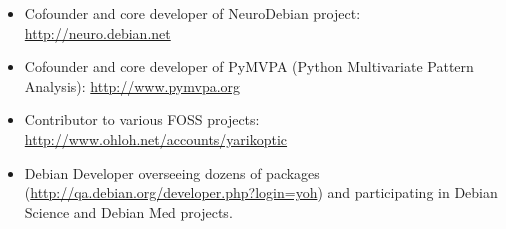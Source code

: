 \documentclass[12pt,overlapped,line]{res}
\begin{document}
\begin{resume}
\begin{itemize}[parsep=0.2em,leftmargin=1em]
 \item Cofounder and core developer of NeuroDebian project: \url{http://neuro.debian.net}

 \item Cofounder and core developer of PyMVPA (Python Multivariate Pattern Analysis): \url{http://www.pymvpa.org}

 \item Contributor to various FOSS projects: \url{http://www.ohloh.net/accounts/yarikoptic}

 \item Debian Developer overseeing dozens of packages
   (\url{http://qa.debian.org/developer.php?login=yoh}) and
   participating in Debian Science and Debian Med projects.

 \end{itemize}


\end{resume}
\end{document}
